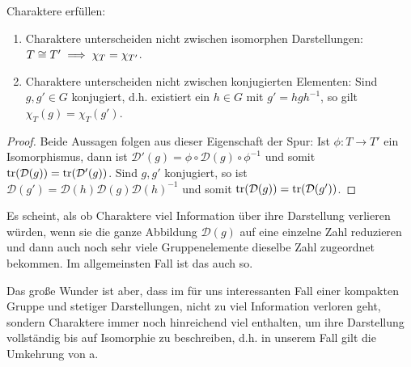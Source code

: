 \begin{lemma}
Charaktere erfüllen:
\begin{enumerate}
\item Charaktere unterscheiden nicht zwischen isomorphen Darstellungen: $T\cong T' \implies \chi_T = \chi_{T'}$.
\item Charaktere unterscheiden nicht zwischen konjugierten Elementen: Sind $g,g'\in G$ konjugiert, d.h. existiert ein $h\in G$ mit $g'=hgh^{-1}$, so gilt $\chi_T(g)=\chi_T(g')$.
\end{enumerate}
\end{lemma}
\begin{proof}
Beide Aussagen folgen aus dieser Eigenschaft der Spur: Ist $\phi: T\to T'$ ein Isomorphismus, dann ist $\mathcal{D}'(g) = \phi\circ\mathcal{D}(g)\circ\phi^{-1}$ und somit $\operatorname{tr}(\mathcal{D}(g)) = \operatorname{tr}(\mathcal{D}'(g))$. Sind $g,g'$ konjugiert, so ist $\mathcal{D}(g') = \mathcal{D}(h)\mathcal{D}(g)\mathcal{D}(h)^{-1}$ und somit $\operatorname{tr}(\mathcal{D}(g)) = \operatorname{tr}(\mathcal{D}(g'))$.
\end{proof}

\begin{remark}
Es scheint, als ob Charaktere viel Information über ihre Darstellung verlieren würden, wenn sie die ganze Abbildung $\mathcal{D}(g)$ auf eine einzelne Zahl reduzieren und dann auch noch sehr viele Gruppenelemente dieselbe Zahl zugeordnet bekommen. Im allgemeinsten Fall ist das auch so.

Das große Wunder ist aber, dass im für uns interessanten Fall einer kompakten Gruppe und stetiger Darstellungen, nicht zu viel Information verloren geht, sondern Charaktere immer noch hinreichend viel enthalten, um ihre Darstellung vollständig bis auf Isomorphie zu beschreiben, d.h. in unserem Fall gilt die Umkehrung von a.
\end{remark}

